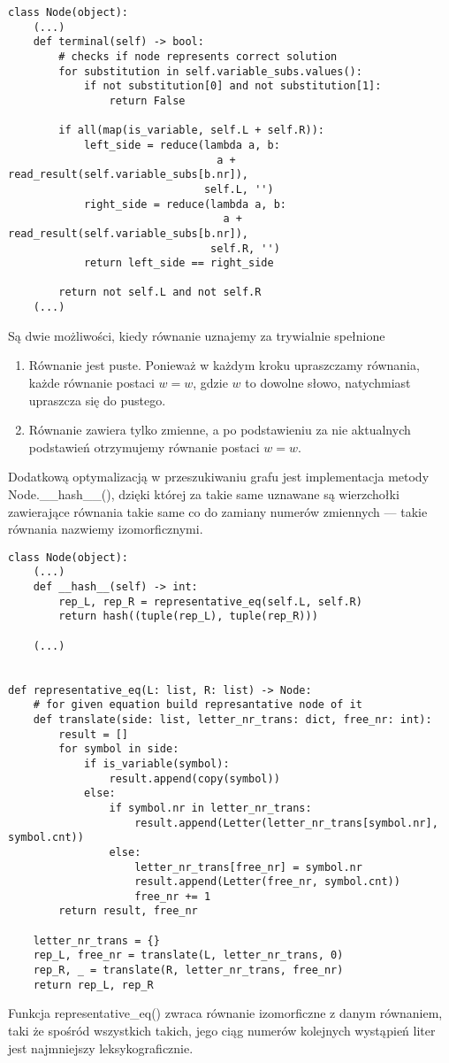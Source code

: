 \documentclass[leqno, 12pt]{article}
\begin{document}
\begin{verbatim}
class Node(object):
    (...)
    def terminal(self) -> bool:
        # checks if node represents correct solution
        for substitution in self.variable_subs.values():
            if not substitution[0] and not substitution[1]:
                return False

        if all(map(is_variable, self.L + self.R)):
            left_side = reduce(lambda a, b:
                                 a + read_result(self.variable_subs[b.nr]),
                               self.L, '')
            right_side = reduce(lambda a, b:
                                  a + read_result(self.variable_subs[b.nr]),
                                self.R, '')
            return left_side == right_side

        return not self.L and not self.R
    (...)
\end{verbatim}

Są dwie możliwości, kiedy równanie uznajemy za trywialnie spełnione

\begin{enumerate}
	\item Równanie jest puste. Ponieważ w każdym kroku upraszczamy równania, każde równanie postaci $w=w$, gdzie $w$ to dowolne słowo, natychmiast upraszcza się do pustego.

\item Równanie zawiera tylko zmienne, a po podstawieniu za nie aktualnych podstawień otrzymujemy równanie postaci $w=w$.
\end{enumerate}

Dodatkową optymalizacją w przeszukiwaniu grafu jest implementacja metody Node.\_\_hash\_\_(), dzięki której za takie same uznawane są wierzchołki zawierające równania takie same co do zamiany numerów zmiennych --- takie równania nazwiemy izomorficznymi.

\begin{verbatim}
class Node(object):
    (...)
    def __hash__(self) -> int:
        rep_L, rep_R = representative_eq(self.L, self.R)
        return hash((tuple(rep_L), tuple(rep_R)))

    (...)


def representative_eq(L: list, R: list) -> Node:
    # for given equation build represantative node of it
    def translate(side: list, letter_nr_trans: dict, free_nr: int):
        result = []
        for symbol in side:
            if is_variable(symbol):
                result.append(copy(symbol))
            else:
                if symbol.nr in letter_nr_trans:
                    result.append(Letter(letter_nr_trans[symbol.nr], symbol.cnt))
                else:
                    letter_nr_trans[free_nr] = symbol.nr
                    result.append(Letter(free_nr, symbol.cnt))
                    free_nr += 1
        return result, free_nr

    letter_nr_trans = {}
    rep_L, free_nr = translate(L, letter_nr_trans, 0)
    rep_R, _ = translate(R, letter_nr_trans, free_nr)
    return rep_L, rep_R
\end{verbatim}

Funkcja representative\_eq() zwraca równanie izomorficzne z danym równaniem, taki że spośród wszystkich takich, jego ciąg numerów kolejnych wystąpień liter jest najmniejszy leksykograficznie. 
\end{document}
